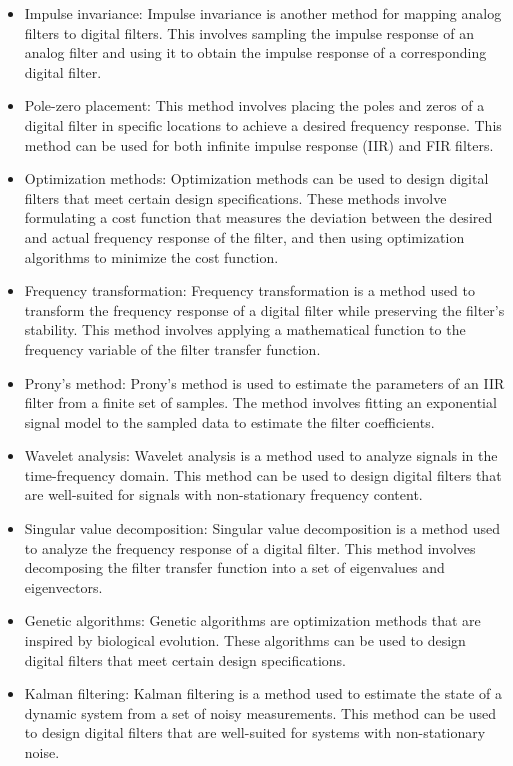 \begin{itemize}
        \item Impulse invariance: Impulse invariance is another method for mapping analog filters to digital filters. This involves sampling the impulse response of an analog filter and using it to obtain the impulse response of a corresponding digital filter.
        \item Pole-zero placement: This method involves placing the poles and zeros of a digital filter in specific locations to achieve a desired frequency response. This method can be used for both infinite impulse response (IIR) and FIR filters.
        \item Optimization methods: Optimization methods can be used to design digital filters that meet certain design specifications. These methods involve formulating a cost function that measures the deviation between the desired and actual frequency response of the filter, and then using optimization algorithms to minimize the cost function.
        \item Frequency transformation: Frequency transformation is a method used to transform the frequency response of a digital filter while preserving the filter's stability. This method involves applying a mathematical function to the frequency variable of the filter transfer function.
        \item Prony's method: Prony's method is used to estimate the parameters of an IIR filter from a finite set of samples. The method involves fitting an exponential signal model to the sampled data to estimate the filter coefficients.
        \item Wavelet analysis: Wavelet analysis is a method used to analyze signals in the time-frequency domain. This method can be used to design digital filters that are well-suited for signals with non-stationary frequency content.
        \item Singular value decomposition: Singular value decomposition is a method used to analyze the frequency response of a digital filter. This method involves decomposing the filter transfer function into a set of eigenvalues and eigenvectors.
        \item Genetic algorithms: Genetic algorithms are optimization methods that are inspired by biological evolution. These algorithms can be used to design digital filters that meet certain design specifications.
        \item Kalman filtering: Kalman filtering is a method used to estimate the state of a dynamic system from a set of noisy measurements. This method can be used to design digital filters that are well-suited for systems with non-stationary noise.

\end{itemize}
